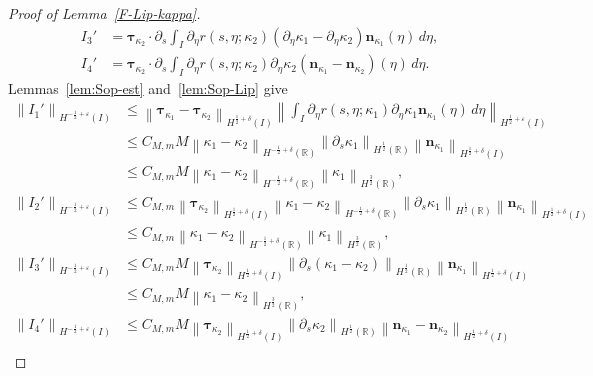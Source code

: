 \documentclass[11pt,reqno]{amsart}
\theoremstyle{plain}
\theoremstyle{definition}
\numberwithin{equation}{section}
\newcommand{\p}{\partial}
\newcommand{\bm}[1]{\boldsymbol{#1}}
\newcommand{\norm}[1]{\left\lVert #1 \right\rVert}
\newcommand{\R}{\mathbb{R}}
\newcommand{\tka}[1]{\bm\tau_{\kappa_{#1}}}
\newcommand{\nka}[1]{\bm n_{\kappa_{#1}}}
\newcommand{\hi}[1]{H^{#1}(I)}
\newcommand{\hr}[1]{H^{#1}(\R)}
\begin{document}
\begin{proof}[Proof of Lemma~\ref{F-Lip-kappa}]
\begin{align}
    I_3' &= \tka{2}\cdot\p_s \int_I\p_\eta r(s,\eta;\kappa_2)(\p_\eta\kappa_1-\p_\eta\kappa
    _2)\nka{1}(\eta) \,d\eta,\\
    I_4' &= \tka{2}\cdot\p_s \int_I\p_\eta r(s,\eta;\kappa_2)\p_\eta\kappa_2(\nka{1}-\nka{2})(\eta) \,d\eta.
\end{align}
Lemmas~\ref{lem:Sop-est} and~\ref{lem:Sop-Lip} give
\begin{equation}
\begin{aligned}
    \norm{I_1'}_{\hi{-\frac{1}{2}+\varepsilon}} &\le \norm{\tka{1}-\tka{2}}_{\hi{\frac{1}{2}+\delta}} \norm{\int_I\p_\eta r(s,\eta;\kappa_1)\p_\eta\kappa_1\nka{1}(\eta) \,d\eta}_{\hi{\frac{1}{2}+\varepsilon}} \\
    & \le C_{M,m}M \norm{\kappa_1-\kappa_2}_{\hr{-\frac{1}{2}+\delta}} \norm{\p_s \kappa_1}_{\hr{\frac{1}{2}}} \norm{\nka{1}}_{\hi{\frac{1}{2}+\delta}}\\
    & \le C_{M,m}M \norm{\kappa_1-\kappa_2}_{\hr{-\frac{1}{2}+\delta}}\norm{\kappa_1}_{\hr{\frac{3}{2}}},
\end{aligned}
\end{equation}
\begin{equation}
\begin{aligned}
    \norm{I_2'}_{\hi{-\frac{1}{2}+\varepsilon}} &\le C_{M,m}\norm{\tka{2}}_{\hi{\frac{1}{2}+\delta}} \norm{\kappa_1-\kappa_2}_{\hr{-\frac{1}{2}+\delta}}\norm{\p_s\kappa_1}_{\hr{\frac{1}{2}}} \norm{\nka{1}}_{\hi{\frac{1}{2}+\delta}} \\
    &\le C_{M,m} \norm{\kappa_1-\kappa_2}_{\hr{-\frac{1}{2}+\delta}}\norm{\kappa_1}_{\hr{\frac{3}{2}}},
\end{aligned}
\end{equation}
\begin{equation}
\begin{aligned}
    \norm{I_3'}_{\hi{-\frac{1}{2}+\varepsilon}} & \le C_{M,m}M \norm{\tka{2}}_{\hi{\frac{1}{2}+\delta}}  \norm{\p_s(\kappa_1-\kappa_2)}_{\hr{\frac{1}{2}}} \norm{\nka{1}}_{\hi{\frac{1}{2}+\delta}}\\
    &\le C_{M,m}M \norm{\kappa_1-\kappa_2}_{\hr{\frac{3}{2}}},
\end{aligned}
\end{equation}
\begin{equation}
\begin{aligned}
    \norm{I_4'}_{\hi{-\frac{1}{2}+\varepsilon}}
    &\le C_{M,m}M \norm{\tka{2}}_{\hi{\frac{1}{2}+\delta}}  \norm{\p_s\kappa_2 }_{\hr{\frac{1}{2}}} \norm{\nka{1}-\nka{2}}_{\hi{\frac{1}{2}+\delta}}\\

\end{aligned}
\end{equation}
\end{proof}
\end{document}
